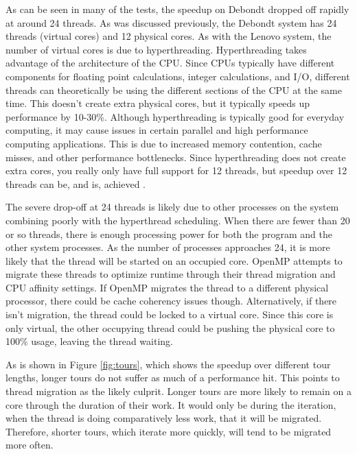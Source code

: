 \documentclass[10pt,letterpaper]{article}
\begin{document}
As can be seen in many of the tests, the speedup on Debondt dropped off rapidly at around 24 threads. As was discussed previously, the Debondt system has 24 threads (virtual cores) and 12 physical cores. As with the Lenovo system, the number of virtual cores is due to hyperthreading. Hyperthreading takes advantage of the architecture of the CPU. Since CPUs typically have different components for floating point calculations, integer calculations, and I/O, different threads can theoretically be using the different sections of the CPU at the same time. This doesn't create extra physical cores, but it typically speeds up performance by 10-30\%. Although hyperthreading is typically good for everyday computing, it may cause issues in certain parallel and high performance computing applications. This is due to increased memory contention, cache misses, and other performance bottlenecks. Since hyperthreading does not create extra cores, you really only have full support for 12 threads, but speedup over 12 threads can be, and is, achieved \cite{leng2002study}.

The severe drop-off at 24 threads is likely due to other processes on the system combining poorly with the hyperthread scheduling. When there are fewer than 20 or so threads, there is enough processing power for both the program and the other system processes. As the number of processes approaches 24, it is more likely that the thread will be started on an occupied core. OpenMP attempts to migrate these threads to optimize runtime through their thread migration and CPU affinity settings. If OpenMP migrates the thread to a different physical processor, there could be cache coherency issues though. Alternatively, if there isn't migration, the thread could be locked to a virtual core. Since this core is only virtual, the other occupying thread could be pushing the physical core to 100\% usage, leaving the thread waiting. 

As is shown in Figure \ref{fig:tours}, which shows the speedup over different tour lengths, longer tours do not suffer as much of a performance hit. This points to thread migration as the likely culprit. Longer tours are more likely to remain on a core through the duration of their work. It would only be during the iteration, when the thread is doing comparatively less work, that it will be migrated. Therefore, shorter tours, which iterate more quickly, will tend to be migrated more often. 
\end{document}
